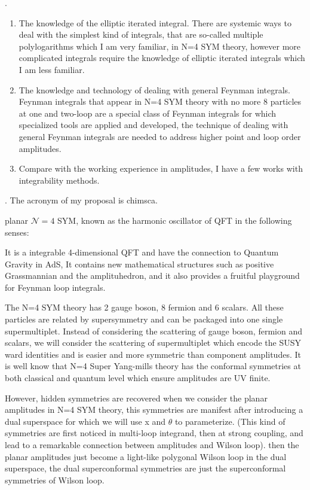 \documentclass[a4paper,11pt]{article}
\begin{document}
\newpage 
{}.
\begin{enumerate}
    \item The knowledge of the elliptic iterated integral. There are systemic ways to deal with the simplest kind of integrals, that are so-called multiple polylogarithms which I am very familiar, in N=4 SYM theory, however more complicated integrals require the knowledge of elliptic iterated integrals which I am less familiar. 
    \item  The knowledge and technology of dealing with general Feynman integrals. Feynman integrals that appear in N=4 SYM theory with no more 8 particles at one and two-loop are a special class of Feynman integrals for which specialized tools are applied and developed, the technique of dealing with general Feynman integrals are needed to address higher point and loop order amplitudes.
    \item Compare with the working experience in amplitudes, I have a few works with integrability methods.
\end{enumerate}

. The acronym of my proposal is chimsca.









\fi






planar $\mathcal{N}=4$ SYM, known as the harmonic oscillator of QFT in the following senses:

It is a integrable 4-dimensional QFT and have the connection to Quantum Gravity in AdS, It contains new mathematical structures  such as positive Grassmannian and the amplituhedron, and it also provides a fruitful playground for Feynman loop integrals. 

The N=4 SYM theory has 2 gauge boson, 8 fermion and 6 scalars. All these particles are related by supersymmetry and can be packaged into one single supermultiplet. Instead of considering the scattering of gauge boson, fermion and scalars, we will consider the scattering of supermultiplet which encode the SUSY ward identities and is easier and more symmetric than component amplitudes. It is well know that N=4 Super Yang-mills theory has the conformal symmetries at both classical and quantum level which ensure amplitudes are UV finite. 

However, hidden symmetries are recovered when we consider the planar amplitudes in N=4 SYM theory, this symmetries  are manifest after introducing a dual superspace  for which we will use x and $\theta$ to parameterize. (This kind of symmetries are first noticed in multi-loop integrand, then at strong coupling, and lead to a remarkable connection between amplitudes and  Wilson loop). then the planar amplitudes just become a light-like polygonal Wilson loop in the dual superspace, the dual superconformal symmetries are just the superconformal symmetries of Wilson loop.
\end{document}
